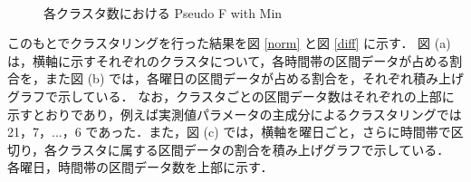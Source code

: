 \documentclass[technicalreport]{ieicej}
\begin{document}
\begin{figure}[tb]
\begin{center}
~
\caption{各クラスタ数における Pseudo F with Min}
\label{PseudoFwithMinPlot}
\end{center}
\end{figure}

このもとでクラスタリングを行った結果を図 \ref{norm} と図 \ref{diff} に示す．
図 (a) は，横軸に示すそれぞれのクラスタについて，各時間帯の区間データが占める割合を，また図 (b) では，各曜日の区間データが占める割合を，それぞれ積み上げグラフで示している．
なお，クラスタごとの区間データ数はそれぞれの上部に示すとおりであり，例えば実測値パラメータの主成分によるクラスタリングでは 21，7，...，6 であった．また，図 (c) では，横軸を曜日ごと，さらに時間帯で区切り，各クラスタに属する区間データの割合を積み上げグラフで示している．
各曜日，時間帯の区間データ数を上部に示す．
\end{document}
